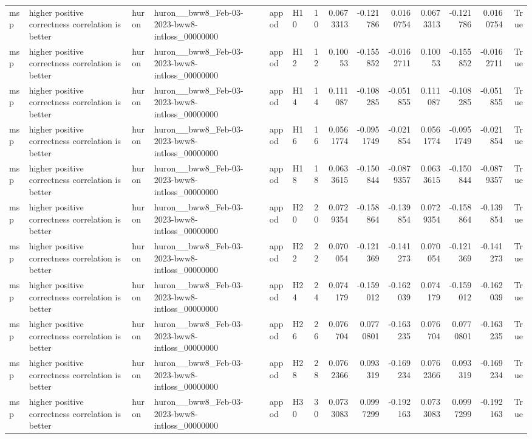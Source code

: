 \begin{longtable}{llllllrrrrrrrr}
msp & higher positive correctness correlation is better & huron & huron\_\_bww8\_Feb-03-2023-bww8-intloss\_00000000 & appod & H10 & 10 & 0.0673313 & -0.121786 & 0.0160754 & 0.0673313 & -0.121786 & 0.0160754 & True \\
msp & higher positive correctness correlation is better & huron & huron\_\_bww8\_Feb-03-2023-bww8-intloss\_00000000 & appod & H12 & 12 & 0.10053 & -0.155852 & -0.0162711 & 0.10053 & -0.155852 & -0.0162711 & True \\
msp & higher positive correctness correlation is better & huron & huron\_\_bww8\_Feb-03-2023-bww8-intloss\_00000000 & appod & H14 & 14 & 0.111087 & -0.108285 & -0.051855 & 0.111087 & -0.108285 & -0.051855 & True \\
msp & higher positive correctness correlation is better & huron & huron\_\_bww8\_Feb-03-2023-bww8-intloss\_00000000 & appod & H16 & 16 & 0.0561774 & -0.0951749 & -0.021854 & 0.0561774 & -0.0951749 & -0.021854 & True \\
msp & higher positive correctness correlation is better & huron & huron\_\_bww8\_Feb-03-2023-bww8-intloss\_00000000 & appod & H18 & 18 & 0.0633615 & -0.150844 & -0.0879357 & 0.0633615 & -0.150844 & -0.0879357 & True \\
msp & higher positive correctness correlation is better & huron & huron\_\_bww8\_Feb-03-2023-bww8-intloss\_00000000 & appod & H20 & 20 & 0.0729354 & -0.158864 & -0.139854 & 0.0729354 & -0.158864 & -0.139854 & True \\
msp & higher positive correctness correlation is better & huron & huron\_\_bww8\_Feb-03-2023-bww8-intloss\_00000000 & appod & H22 & 22 & 0.070054 & -0.121369 & -0.141273 & 0.070054 & -0.121369 & -0.141273 & True \\
msp & higher positive correctness correlation is better & huron & huron\_\_bww8\_Feb-03-2023-bww8-intloss\_00000000 & appod & H24 & 24 & 0.074179 & -0.159012 & -0.162039 & 0.074179 & -0.159012 & -0.162039 & True \\
msp & higher positive correctness correlation is better & huron & huron\_\_bww8\_Feb-03-2023-bww8-intloss\_00000000 & appod & H26 & 26 & 0.076704 & 0.0770801 & -0.163235 & 0.076704 & 0.0770801 & -0.163235 & True \\
msp & higher positive correctness correlation is better & huron & huron\_\_bww8\_Feb-03-2023-bww8-intloss\_00000000 & appod & H28 & 28 & 0.0762366 & 0.093319 & -0.169234 & 0.0762366 & 0.093319 & -0.169234 & True \\
msp & higher positive correctness correlation is better & huron & huron\_\_bww8\_Feb-03-2023-bww8-intloss\_00000000 & appod & H30 & 30 & 0.0733083 & 0.0997299 & -0.192163 & 0.0733083 & 0.0997299 & -0.192163 & True \\

\end{longtable}
